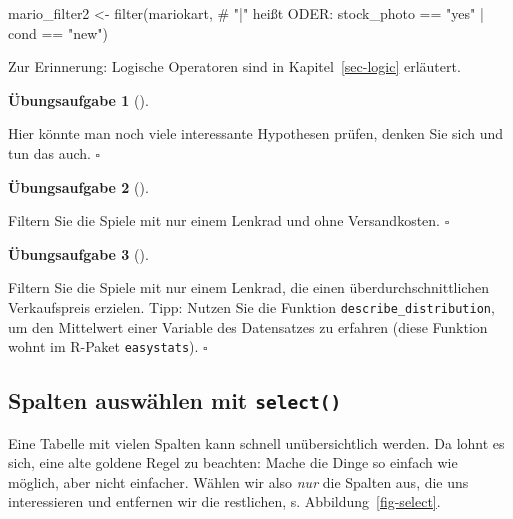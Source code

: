 \documentclass[
  letterpaper,
]{scrbook}
\newenvironment{Shaded}{\begin{snugshade}}{\end{snugshade}}
\newcommand{\CommentTok}[1]{\textcolor[rgb]{0.37,0.37,0.37}{#1}}
\newcommand{\FunctionTok}[1]{\textcolor[rgb]{0.28,0.35,0.67}{#1}}
\newcommand{\NormalTok}[1]{\textcolor[rgb]{0.00,0.23,0.31}{#1}}
\newcommand{\OtherTok}[1]{\textcolor[rgb]{0.00,0.23,0.31}{#1}}
\newcommand{\SpecialCharTok}[1]{\textcolor[rgb]{0.37,0.37,0.37}{#1}}
\newcommand{\StringTok}[1]{\textcolor[rgb]{0.13,0.47,0.30}{#1}}
\theoremstyle{definition}
\newtheorem{exercise}{Übungsaufgabe}[chapter]
\theoremstyle{definition}
\theoremstyle{definition}
\theoremstyle{remark}
\begin{document}
\begin{Shaded}
\begin{Highlighting}[]
\NormalTok{mario\_filter2 }\OtherTok{\textless{}{-}} 
  \FunctionTok{filter}\NormalTok{(mariokart,  }\CommentTok{\# "|" heißt ODER:}
\NormalTok{         stock\_photo }\SpecialCharTok{==} \StringTok{"yes"} \SpecialCharTok{|}\NormalTok{ cond }\SpecialCharTok{==} \StringTok{"new"}\NormalTok{)}
\end{Highlighting}
\end{Shaded}

Zur Erinnerung: Logische Operatoren sind in Kapitel~\ref{sec-logic}
erläutert.

\begin{exercise}[]\protect\hypertarget{exr-hyps-filter}{}\label{exr-hyps-filter}

Hier könnte man noch viele interessante Hypothesen prüfen, denken Sie
sich und tun das auch. \(\square\)

\end{exercise}

\begin{exercise}[]\protect\hypertarget{exr-filter2}{}\label{exr-filter2}

Filtern Sie die Spiele mit nur einem Lenkrad und ohne Versandkosten.
\(\square\)

\end{exercise}

\begin{exercise}[]\protect\hypertarget{exr-filter3}{}\label{exr-filter3}

Filtern Sie die Spiele mit nur einem Lenkrad, die einen
überdurchschnittlichen Verkaufspreis erzielen. Tipp: Nutzen Sie die
Funktion \texttt{describe\_distribution}, um den Mittelwert einer
Variable des Datensatzes zu erfahren (diese Funktion wohnt im R-Paket
\texttt{easystats}). \(\square\)

\end{exercise}

\subsection{\texorpdfstring{Spalten auswählen mit
\texttt{select()}}{Spalten auswählen mit select()}}\label{spalten-auswuxe4hlen-mit-select}

Eine Tabelle mit vielen Spalten kann schnell unübersichtlich werden. Da
lohnt es sich, eine alte goldene Regel zu beachten: Mache die Dinge so
einfach wie möglich, aber nicht einfacher. Wählen wir also \emph{nur}
die Spalten aus, die uns interessieren und entfernen wir die restlichen,
s. Abbildung~\ref{fig-select}.
\end{document}
